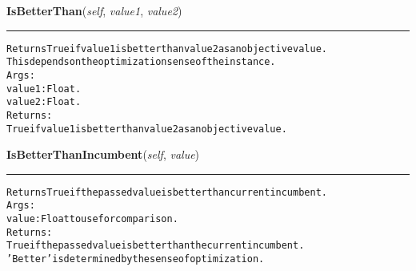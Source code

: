     \vspace{0.5ex}

\hspace{.8\funcindent}\begin{boxedminipage}{\funcwidth}

    \raggedright \textbf{IsBetterThan}(\textit{self}, \textit{value1}, \textit{value2})

    \vspace{-1.5ex}

    \rule{\textwidth}{0.5\fboxrule}
\setlength{\parskip}{2ex}
\begin{alltt}

Returns True if value1 is better than value2 as an objective value.
This depends on the optimization sense of the instance.
Args:
  value1: Float.
  value2: Float.
Returns:
  True if value1 is better than value2 as an objective value.
\end{alltt}

\setlength{\parskip}{1ex}
    \end{boxedminipage}

    \label{coinor:grumpy:BB:BBTree:IsBetterThanIncumbent}

    \vspace{0.5ex}

\hspace{.8\funcindent}\begin{boxedminipage}{\funcwidth}

    \raggedright \textbf{IsBetterThanIncumbent}(\textit{self}, \textit{value})

    \vspace{-1.5ex}

    \rule{\textwidth}{0.5\fboxrule}
\setlength{\parskip}{2ex}
\begin{alltt}

Returns True if the passed value is better than current incumbent.
Args:
  value: Float to use for comparison.
Returns:
  True if the passed value is better than the current incumbent.
  'Better' is determined by the sense of optimization.
\end{alltt}

\setlength{\parskip}{1ex}
    \end{boxedminipage}

    \label{coinor:grumpy:BB:BBTree:UpdateObjectiveValueLimits}

